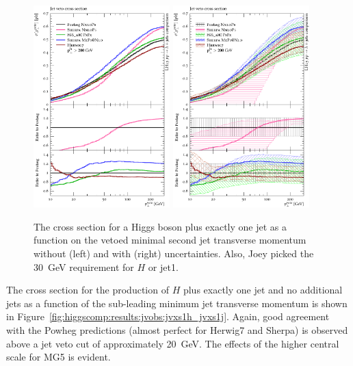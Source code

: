 \begin{figure}[t!]
  \centering
  \includegraphics[width=0.47\textwidth]{figures/hjetscomp_u_xs_jet_veto_j1_200.pdf}
  \hfill
  \includegraphics[width=0.47\textwidth]{figures/hjetscomp_xs_jet_veto_j1_200.pdf}
  \caption{
    The cross
    section for a Higgs boson plus exactly one jet as a function on
    the vetoed minimal second jet transverse momentum without
    (left) and with (right) uncertainties. Also, Joey picked the
    30~GeV requirement for $H$ or jet1.
    \label{fig:higgscomp:results:jvobs:jvxs1j}
  }
\end{figure}

The cross section for the production of $H$ plus exactly one jet and
no additional jets as a function of the sub-leading minimum jet
transverse momentum is shown in
Figure~\ref{fig:higgscomp:results:jvobs:jvxs1h_jvxs1j}. Again, good
agreement with the Powheg predictions (almost perfect for Herwig7 and
Sherpa) is observed above a jet veto cut of approximately 20~GeV. The
effects of the higher central scale for MG5 is evident.

